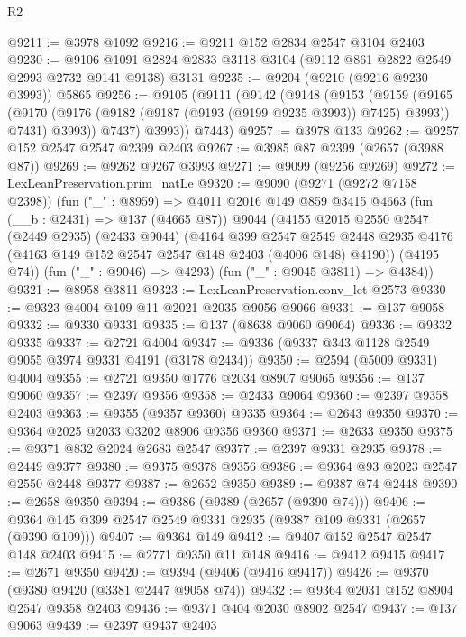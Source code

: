 \begin{lexlean}{R2}
\begin{coremodule}
@9211 := @3978 @1092
@9216 := @9211 @152 @2834 @2547 @3104 @2403
@9230 := @9106 @1091 @2824 @2833 @3118 @3104 (@9112 @861 @2822 @2549 @2993 @2732 @9141 @9138) @3131
@9235 := @9204 (@9210 (@9216 @9230 @3993)) @5865
@9256 := @9105
    (@9111
      (@9142
        (@9148
          (@9153
            (@9159
              (@9165
                (@9170 (@9176 (@9182 (@9187 (@9193 (@9199 @9235 @3993)) @7425) @3993)) @7431)
                @3993))
            @7437)
          @3993))
      @7443)
@9257 := @3978 @133
@9262 := @9257 @152 @2547 @2547 @2399 @2403
@9267 := @3985 @87 @2399 (@2657 (@3988 @87))
@9269 := @9262 @9267 @3993
@9271 := @9099 (@9256 @9269)
@9272 := LexLeanPreservation.prim_natLe
@9320 := @9090
    (@9271 (@9272 @7158 @2398))
    (fun ("_" : @8959) =>
    @4011
      @2016
      @149
      @859
      @3415
      @4663
      (fun (__b : @2431) => @137 (@4665 @87))
      @9044
      (@4155
        @2015
        @2550
        @2547
        (@2449 @2935)
        (@2433 @9044)
        (@4164
          @399
          @2547
          @2549
          @2448
          @2935
          @4176
          (@4163 @149 @152 @2547 @2547 @148 @2403 (@4006 @148) @4190))
        (@4195 @74))
      (fun ("_" : @9046) => @4293)
      (fun ("_" : @9045 @3811) => @4384))
@9321 := @8958 @3811
@9323 := LexLeanPreservation.conv_let @2573
@9330 := @9323 @4004 @109 @11 @2021 @2035 @9056 @9066
@9331 := @137 @9058
@9332 := @9330 @9331
@9335 := @137 (@8638 @9060 @9064)
@9336 := @9332 @9335
@9337 := @2721 @4004
@9347 := @9336 (@9337 @343 @1128 @2549 @9055 @3974 @9331 @4191 (@3178 @2434))
@9350 := @2594 (@5009 @9331) @4004
@9355 := @2721 @9350 @1776 @2034 @8907 @9065
@9356 := @137 @9060
@9357 := @2397 @9356
@9358 := @2433 @9064
@9360 := @2397 @9358 @2403
@9363 := @9355 (@9357 @9360) @9335
@9364 := @2643 @9350
@9370 := @9364 @2025 @2033 @3202 @8906 @9356 @9360
@9371 := @2633 @9350
@9375 := @9371 @832 @2024 @2683 @2547
@9377 := @2397 @9331 @2935
@9378 := @2449 @9377
@9380 := @9375 @9378 @9356
@9386 := @9364 @93 @2023 @2547 @2550 @2448 @9377
@9387 := @2652 @9350
@9389 := @9387 @74 @2448
@9390 := @2658 @9350
@9394 := @9386 (@9389 (@2657 (@9390 @74)))
@9406 := @9364 @145 @399 @2547 @2549 @9331 @2935 (@9387 @109 @9331 (@2657 (@9390 @109)))
@9407 := @9364 @149
@9412 := @9407 @152 @2547 @2547 @148 @2403
@9415 := @2771 @9350 @11 @148
@9416 := @9412 @9415
@9417 := @2671 @9350
@9420 := @9394 (@9406 (@9416 @9417))
@9426 := @9370 (@9380 @9420 (@3381 @2447 @9058 @74))
@9432 := @9364 @2031 @152 @8904 @2547 @9358 @2403
@9436 := @9371 @404 @2030 @8902 @2547
@9437 := @137 @9063
@9439 := @2397 @9437 @2403

\end{coremodule}
\end{lexlean}
